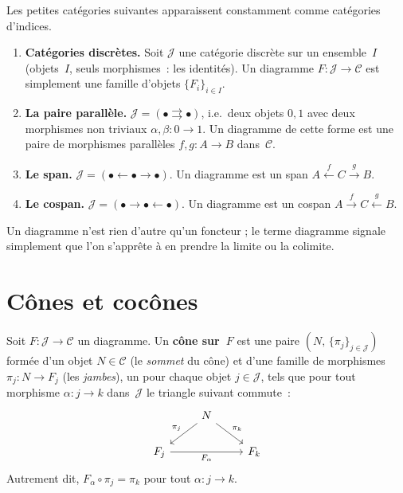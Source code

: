 \begin{exemple}\label{ex:formes-diagrammes}
Les petites catégories suivantes apparaissent constamment comme catégories d'indices.
\begin{enumerate}[label=(\roman*)]
\item \textbf{Catégories discrètes.}
    Soit $\mathcal{J}$ une catégorie discrète sur un ensemble~$I$
    (objets~$I$, seuls morphismes~: les identités).
    Un diagramme $F\colon \mathcal{J}\to\mathcal{C}$ est simplement une famille
    d'objets $\{F_i\}_{i\in I}$.

\item \textbf{La paire parallèle.}
    $\mathcal{J} = (\bullet \rightrightarrows \bullet)$,
    i.e.\ deux objets $0,1$ avec deux morphismes non triviaux
    $\alpha,\beta\colon 0\to 1$.
    Un diagramme de cette forme est une paire de morphismes parallèles
    $f,g\colon A\to B$ dans~$\mathcal{C}$.

\item \textbf{Le span.}
    $\mathcal{J} = (\bullet \leftarrow \bullet \rightarrow \bullet)$.
    Un diagramme est un span $A \xleftarrow{f} C \xrightarrow{g} B$.

\item \textbf{Le cospan.}
    $\mathcal{J} = (\bullet \rightarrow \bullet \leftarrow \bullet)$.
    Un diagramme est un cospan $A \xrightarrow{f} C \xleftarrow{g} B$.
\end{enumerate}
\end{exemple}

\begin{remarque}\label{rem:diagramme-notation}
Un diagramme n'est rien d'autre qu'un foncteur ; le terme
\og{}diagramme\fg{} signale simplement que l'on s'apprête à en
prendre la limite ou la colimite.
\end{remarque}


\section{Cônes et cocônes}\label{sec:cones}

\begin{definition}[Cône]\label{def:cone}
Soit $F\colon \mathcal{J}\to\mathcal{C}$ un diagramme.
Un \textbf{cône sur~$F$} est une paire $(N,\,\{\pi_j\}_{j\in\mathcal{J}})$
formée d'un objet $N\in\mathcal{C}$ (le \emph{sommet} du cône)
et d'une famille de morphismes $\pi_j\colon N\to F_j$ (les \emph{jambes}),
un pour chaque objet $j\in\mathcal{J}$,
tels que pour tout morphisme $\alpha\colon j\to k$ dans~$\mathcal{J}$
le triangle suivant commute~:
\[
\begin{tikzcd}
& N \arrow[dl, "\pi_j"'] \arrow[dr, "\pi_k"] & \\
F_j \arrow[rr, "F_\alpha"'] & & F_k
\end{tikzcd}
\]
Autrement dit, $F_\alpha \circ \pi_j = \pi_k$ pour tout $\alpha\colon j\to k$.
\end{definition}

